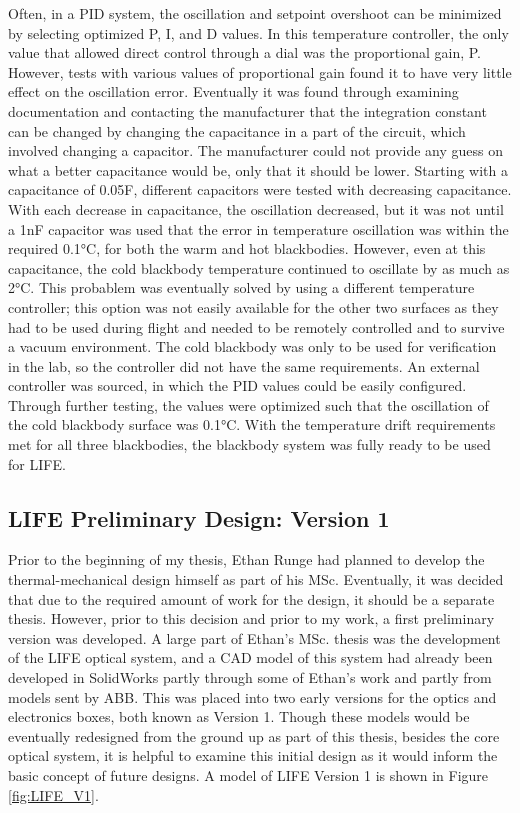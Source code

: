Often, in a PID system, the oscillation and setpoint overshoot can be minimized by selecting optimized P, I, and D values. In this temperature controller, the only value that allowed direct control through a dial was the proportional gain, P. However, tests with various values of proportional gain found it to have very little effect on the oscillation error. Eventually it was found through examining documentation and contacting the manufacturer that the integration constant can be changed by changing the capacitance in a part of the circuit, which involved changing a capacitor. The manufacturer could not provide any guess on what a better capacitance would be, only that it should be lower. Starting with a capacitance of 0.05{\textmu}F, different capacitors were tested with decreasing capacitance. With each decrease in capacitance, the oscillation decreased, but it was not until a 1nF capacitor was used that the error in temperature oscillation was within the required 0.1°C, for both the warm and hot blackbodies. However, even at this capacitance, the cold blackbody temperature continued to oscillate by as much as 2°C. This probablem was eventually solved by using a different temperature controller; this option was not easily available for the other two surfaces as they had to be used during flight and needed to be remotely controlled and to survive a vacuum environment. The cold blackbody was only to be used for verification in the lab, so the controller did not have the same requirements. An external controller was sourced, in which the PID values could be easily configured. Through further testing, the values were optimized such that the oscillation of the cold blackbody surface was 0.1°C. With the temperature drift requirements met for all three blackbodies, the blackbody system was fully ready to be used for LIFE.

\subsection{LIFE Preliminary Design: Version 1} %
Prior to the beginning of my thesis, Ethan Runge had planned to develop the thermal-mechanical design himself as part of his MSc. Eventually, it was decided that due to the required amount of work for the design, it should be a separate thesis. However, prior to this decision and prior to my work, a first preliminary version was developed. A large part of Ethan's MSc. thesis was the development of the LIFE optical system, and a CAD model of this system had already been developed in SolidWorks partly through some of Ethan's work and partly from models sent by ABB. This was placed into two early versions for the optics and electronics boxes, both known as Version 1. Though these models would be eventually redesigned from the ground up as part of this thesis, besides the core optical system, it is helpful to examine this initial design as it would inform the basic concept of future designs. A model of LIFE Version 1 is shown in Figure \ref{fig:LIFE_V1}.

